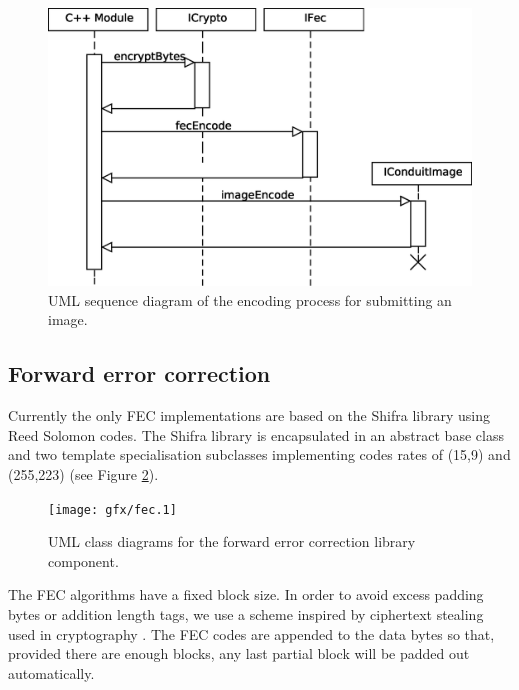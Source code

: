     \begin{figure}[tb]
        \begin{center}
                \includegraphics[width=12cm]{gfx/img-seq.eps}
            \caption{UML sequence diagram of the encoding process for submitting an image.}
            \label{eps:img}
        \end{center}
    \end{figure}


\FloatBarrier
\subsection{Forward error correction}

Currently the only FEC implementations are based on the Shifra library using Reed Solomon codes. The Shifra library is encapsulated in an abstract base class and two template specialisation subclasses implementing codes rates of (15,9) and (255,223) (see Figure \ref{uml:fec}).


    \begin{figure}[tb]
        \begin{center}
                \texttt{[image: gfx/fec.1]}
            \caption{UML class diagrams for the forward error correction library component.}
            \label{uml:fec}
        \end{center}
    \end{figure}

The FEC algorithms have a fixed block size. In order to avoid excess padding bytes or addition length tags, we use a scheme inspired by ciphertext stealing used in cryptography \cite{stealing}. The FEC codes are appended to the data bytes so that, provided there are enough blocks, any last partial block will be padded out automatically.


